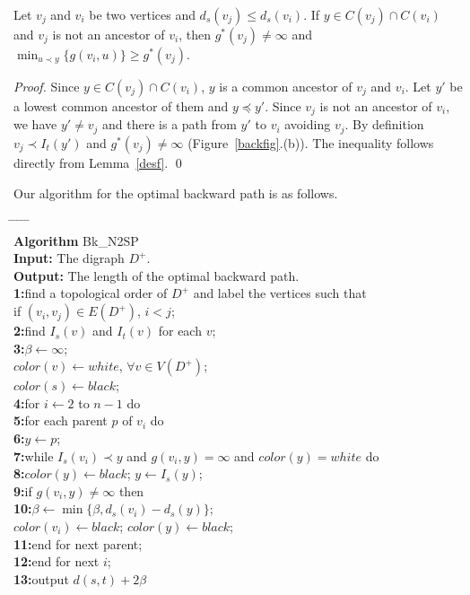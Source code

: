 \begin{corollary}\label{black}
Let $v_j$ and $v_i$ be two vertices and $d_s(v_j)\leq d_s(v_i)$. If $y\in C(v_j)\cap C(v_i)$ and $v_j$ is not an ancestor of $v_i$, then $g^*(v_j)\neq \infty$ and $\min_{u\prec y}\{g(v_i,u)\}\geq g^*(v_j)$.
\end{corollary}
\begin{proof}
Since $y\in C(v_j)\cap C(v_i)$, $y$ is a common ancestor of $v_j$ and $v_i$.
Let $y'$ be a lowest common ancestor of them and $y\preceq y'$.
Since $v_j$ is not an ancestor of $v_i$, we have $y'\neq v_j$ and there is a path from $y'$ to $v_i$ avoiding $v_j$.
By definition $v_j\prec I_t(y')$ and $g^*(v_j)\neq \infty$ (Figure~\ref{backfig}.(b)).
The inequality follows directly from Lemma~\ref{desf}.
\qed\end{proof}

Our algorithm for the optimal backward path is as follows. 
\begin{tabbing}
\hspace*{1.5em} \= \hspace*{1.2em} \= \hspace*{1.2em} \= \hspace*{1.2em} \= \hspace*{1.2em} \= \kill \\
{\bf Algorithm} Bk\_N2SP \\
{\bf Input: }The digraph $D^+$. \\
{\bf Output: }The length of the optimal backward path. \\
{\bf 1:}\>find a topological order of $D^+$ and label the vertices such that \\
\>if $(v_i,v_j)\in E(D^+)$, $i<j$;\\
{\bf 2:}\>find $I_s(v)$ and $I_t(v)$ for each $v$;\\
{\bf 3:}\>$\beta\leftarrow \infty$;\\
\>$color(v)\leftarrow white$, $\forall v\in V(D^+)$;\\
\>$color(s)\leftarrow black$;\\
{\bf 4:}\>for $i\leftarrow 2$ to $n-1$ do \\
{\bf 5:}\>\>for each parent $p$ of $v_i$ do \\
{\bf 6:}\>\>\>$y\leftarrow p$; \\
{\bf 7:}\>\>\>while $I_s(v_i)\prec y$ and $g(v_i,y)=\infty$ and $color(y)=white$ do\\
{\bf 8:}\>\>\>\>$color(y)\leftarrow black$; $y\leftarrow I_s(y)$; \\
{\bf 9:}\>\>\>if $g(v_i,y)\neq \infty$ then\\
{\bf 10:}\>\>\>\>$\beta\leftarrow \min\{\beta,d_s(v_i)-d_s(y)\}$; \\
\>\>\>\>$color(v_i)\leftarrow black$; $color(y)\leftarrow black$;\\
{\bf 11:}\>\>end for next parent;\\
{\bf 12:}\>end for next $i$;\\
{\bf 13:}\>output $d(s,t)+2\beta$\\
\end{tabbing}



